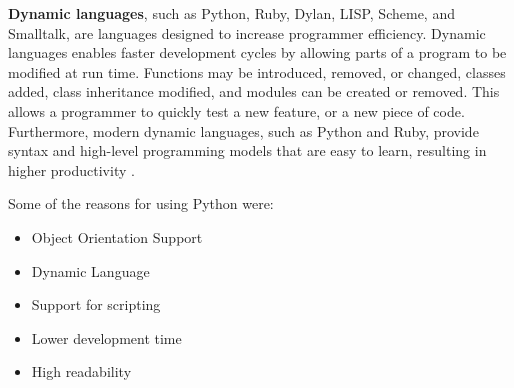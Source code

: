\documentclass[12pt]{article}
\begin{document}
\noindent
\textbf{Dynamic languages}, such as Python, Ruby, Dylan, LISP, Scheme, and Smalltalk, are languages designed to increase programmer efficiency. Dynamic
languages enables faster development cycles by allowing parts of a program to be modified at run time. Functions may be introduced, removed, or changed, classes added, class inheritance modified, and modules can be created or removed. This allows a programmer to quickly test a new feature, or a new piece of code. Furthermore, modern dynamic languages, such as Python and Ruby, provide syntax and high-level programming models that are easy to learn, resulting in higher productivity \cite{lund}.
\bigskip

\noindent
Some of the reasons for using Python were:
\begin{itemize}
\item Object Orientation Support
\item Dynamic Language
\item Support for scripting
\item Lower development time
\item High readability
\end{itemize}
\end{document}
